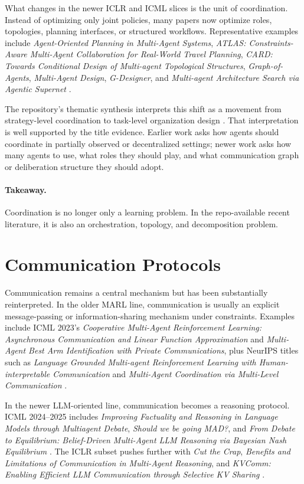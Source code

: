 \documentclass[11pt]{article}
\begin{document}
What changes in the newer ICLR and ICML slices is the unit of coordination. Instead of optimizing only joint policies, many papers now optimize roles, topologies, planning interfaces, or structured workflows. Representative examples include \emph{Agent-Oriented Planning in Multi-Agent Systems}, \emph{ATLAS: Constraints-Aware Multi-Agent Collaboration for Real-World Travel Planning}, \emph{CARD: Towards Conditional Design of Multi-agent Topological Structures}, \emph{Graph-of-Agents}, \emph{Multi-Agent Design}, \emph{G-Designer}, and \emph{Multi-agent Architecture Search via Agentic Supernet} \cite{iclr_subset,icml_list}.

The repository's thematic synthesis interprets this shift as a movement from strategy-level coordination to task-level organization design \cite{theme_synthesis}. That interpretation is well supported by the title evidence. Earlier work asks how agents should coordinate in partially observed or decentralized settings; newer work asks how many agents to use, what roles they should play, and what communication graph or deliberation structure they should adopt.

\paragraph{Takeaway.}
Coordination is no longer only a learning problem. In the repo-available recent literature, it is also an orchestration, topology, and decomposition problem.

\section{Communication Protocols}
Communication remains a central mechanism but has been substantially reinterpreted. In the older MARL line, communication is usually an explicit message-passing or information-sharing mechanism under constraints. Examples include ICML 2023's \emph{Cooperative Multi-Agent Reinforcement Learning: Asynchronous Communication and Linear Function Approximation} and \emph{Multi-Agent Best Arm Identification with Private Communications}, plus NeurIPS titles such as \emph{Language Grounded Multi-agent Reinforcement Learning with Human-interpretable Communication} and \emph{Multi-Agent Coordination via Multi-Level Communication} \cite{icml_list,neurips_list}.

In the newer LLM-oriented line, communication becomes a reasoning protocol. ICML 2024--2025 includes \emph{Improving Factuality and Reasoning in Language Models through Multiagent Debate}, \emph{Should we be going MAD?}, and \emph{From Debate to Equilibrium: Belief-Driven Multi-Agent LLM Reasoning via Bayesian Nash Equilibrium} \cite{icml_list}. The ICLR subset pushes further with \emph{Cut the Crap}, \emph{Benefits and Limitations of Communication in Multi-Agent Reasoning}, and \emph{KVComm: Enabling Efficient LLM Communication through Selective KV Sharing} \cite{iclr_subset}.
\end{document}

